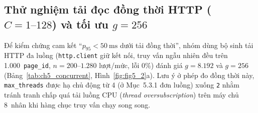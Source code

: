 \documentclass[13pt,a4paper]{report}
\begin{document}
\subsection{Thử nghiệm tải đọc đồng thời HTTP (\texorpdfstring{$C = 1\text{--}128$}{C = 1..128}) và tối ưu \texorpdfstring{$g = 256$}{g = 256}}
Để kiểm chứng cam kết ``$p_{95} < 50~\text{ms}$ dưới tải đồng thời'', nhóm dùng bộ sinh tải HTTP đa luồng (\texttt{http.\allowbreak{}client} giữ kết nối, truy vấn ngẫu nhiên đều trên 1.000~\texttt{page\_\allowbreak{}id}, $n = 200\text{--}1.280$ lượt/mức, lỗi 0\%) đánh giá $g = 8.192$ và $g = 256$ (Bảng~\ref{tab:ch5_concurrent}, Hình~\ref{fig:fig5_2}a). Lưu ý ở phép đo đồng thời này, \texttt{max\_\allowbreak{}threads} được hạ chủ động từ 4 (ở Mục~5.3.1 đơn luồng) xuống \texttt{2} nhằm tránh tranh chấp quá tải luồng CPU (\textit{thread oversubscription}) trên máy chủ 8~nhân khi hàng chục truy vấn chạy song song.
\end{document}

